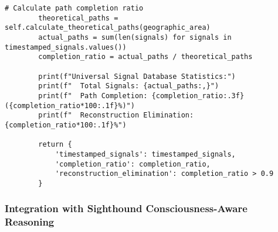 \documentclass[12pt,a4paper]{article}
\begin{document}
\begin{lstlisting}[style=pythonstyle, caption=S-Entropy Compression Implementation for GPS]
        # Calculate path completion ratio
        theoretical_paths = self.calculate_theoretical_paths(geographic_area)
        actual_paths = sum(len(signals) for signals in timestamped_signals.values())
        completion_ratio = actual_paths / theoretical_paths
        
        print(f"Universal Signal Database Statistics:")
        print(f"  Total Signals: {actual_paths:,}")
        print(f"  Path Completion: {completion_ratio:.3f} ({completion_ratio*100:.1f}%)")
        print(f"  Reconstruction Elimination: {completion_ratio*100:.1f}%")
        
        return {
            'timestamped_signals': timestamped_signals,
            'completion_ratio': completion_ratio,
            'reconstruction_elimination': completion_ratio > 0.9
        }
\end{lstlisting}

\subsubsection{Integration with Sighthound Consciousness-Aware Reasoning}
\end{document}
